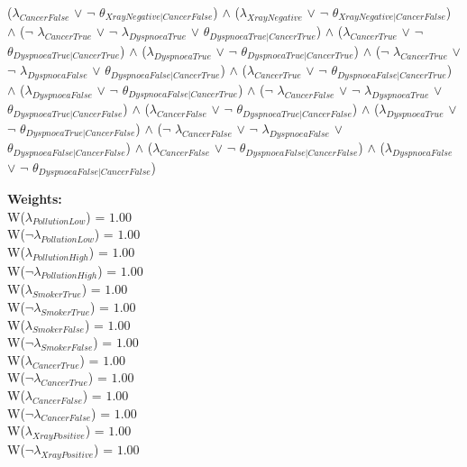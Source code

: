 \begin{center}
 ($\lambda_{CancerFalse}$ $\lor$ $\neg$ $\theta_{XrayNegative|CancerFalse}$) $\land$ 
 ($\lambda_{XrayNegative}$ $\lor$ $\neg$ $\theta_{XrayNegative|CancerFalse}$) $\land$ 
 ($\neg$ $\lambda_{CancerTrue}$ $\lor$ $\neg$ $\lambda_{DyspnoeaTrue}$ $\lor$ $\theta_{DyspnoeaTrue|CancerTrue}$) $\land$ 
 ($\lambda_{CancerTrue}$ $\lor$ $\neg$ $\theta_{DyspnoeaTrue|CancerTrue}$) $\land$ 
 ($\lambda_{DyspnoeaTrue}$ $\lor$ $\neg$ $\theta_{DyspnoeaTrue|CancerTrue}$) $\land$ 
 ($\neg$ $\lambda_{CancerTrue}$ $\lor$ $\neg$ $\lambda_{DyspnoeaFalse}$ $\lor$ $\theta_{DyspnoeaFalse|CancerTrue}$) $\land$ 
 ($\lambda_{CancerTrue}$ $\lor$ $\neg$ $\theta_{DyspnoeaFalse|CancerTrue}$) $\land$ 
 ($\lambda_{DyspnoeaFalse}$ $\lor$ $\neg$ $\theta_{DyspnoeaFalse|CancerTrue}$) $\land$ 
 ($\neg$ $\lambda_{CancerFalse}$ $\lor$ $\neg$ $\lambda_{DyspnoeaTrue}$ $\lor$ $\theta_{DyspnoeaTrue|CancerFalse}$) $\land$ 
 ($\lambda_{CancerFalse}$ $\lor$ $\neg$ $\theta_{DyspnoeaTrue|CancerFalse}$) $\land$ 
 ($\lambda_{DyspnoeaTrue}$ $\lor$ $\neg$ $\theta_{DyspnoeaTrue|CancerFalse}$) $\land$ 
 ($\neg$ $\lambda_{CancerFalse}$ $\lor$ $\neg$ $\lambda_{DyspnoeaFalse}$ $\lor$ $\theta_{DyspnoeaFalse|CancerFalse}$) $\land$ 
 ($\lambda_{CancerFalse}$ $\lor$ $\neg$ $\theta_{DyspnoeaFalse|CancerFalse}$) $\land$ 
 ($\lambda_{DyspnoeaFalse}$ $\lor$ $\neg$ $\theta_{DyspnoeaFalse|CancerFalse}$)
\end{center}
\textbf{Weights:}\\
W($\lambda_{PollutionLow}$) = $1.00$\\ 
W($\neg \lambda_{PollutionLow}$) = $1.00$\\ 
W($\lambda_{PollutionHigh}$) = $1.00$\\ 
W($\neg \lambda_{PollutionHigh}$) = $1.00$\\ 
W($\lambda_{SmokerTrue}$) = $1.00$\\ 
W($\neg \lambda_{SmokerTrue}$) = $1.00$\\ 
W($\lambda_{SmokerFalse}$) = $1.00$\\ 
W($\neg \lambda_{SmokerFalse}$) = $1.00$\\ 
W($\lambda_{CancerTrue}$) = $1.00$\\ 
W($\neg \lambda_{CancerTrue}$) = $1.00$\\ 
W($\lambda_{CancerFalse}$) = $1.00$\\ 
W($\neg \lambda_{CancerFalse}$) = $1.00$\\ 
W($\lambda_{XrayPositive}$) = $1.00$\\ 
W($\neg \lambda_{XrayPositive}$) = $1.00$\\ 
